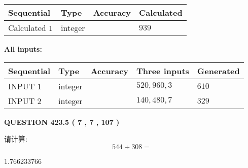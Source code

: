 \documentclass{ctexart}
\begin{document}
   
   
   
\noindent{}
   
   
  
  
\noindent\begin{tabular}{|l|l|l|l|}
\hline
 Sequential & Type & Accuracy & Calculated \\ 
\hline
 
 
  Calculated $  1 $ & integer &  & 
  $ 939 $ 
 \\  \hline  
 \end{tabular}
   
   
   
   
\noindent\vspace{0.1in}\hspace{-0.08in} {\textbf{\Large{All inputs: }}}
   
   
  
  
\noindent\begin{tabular}{|l|l|l|l|l|}
\hline
 Sequential & Type & Accuracy & Three inputs & Generated \\ 
\hline
 
 
  INPUT $  1 $ & integer &  & $
 520
 , 
 960
 , 
 3
 $ & $ 610 $ 
 \\  \hline  
 
 
  INPUT $  2 $ & integer &  & $
 140
 , 
 480
 , 
 7
 $ & $ 329 $ 
 \\  \hline  
 \end{tabular}
   
   
  
\vspace{0.2in}
  
{\textbf{\Large{QUESTION
423.5 
 ( 7 , 7 , 107 )
}}}
  
  
 
请计算:
\begin{equation}
544  \div    %
308 = \nonumber
\end{equation}
 
 
 
\noindent{}
 
 

1.766233766
 
 
\noindent{}
 
 

 
 
 
\noindent{}
 
\end{document}
